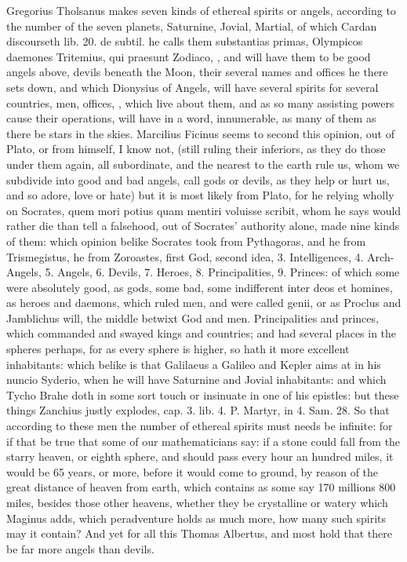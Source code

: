 {Gregorius Tholsanus makes seven kinds of ethereal spirits or
angels, according to the number of the seven planets, Saturnine,
Jovial, Martial, of which Cardan discourseth lib. 20. de subtil. he
calls them substantias primas, Olympicos daemones Tritemius, qui
praesunt Zodiaco, \etc{}, and will have them to be good angels above,
devils beneath the Moon, their several names and offices he there sets
down, and which Dionysius of Angels, will have several spirits for
several countries, men, offices, \etc{}, which live about them, and as so
many assisting powers cause their operations, will have in a word,
innumerable, as many of them as there be stars in the skies.
Marcilius Ficinus seems to second this opinion, out of Plato, or
from himself, I know not, (still ruling their inferiors, as they do
those under them again, all subordinate, and the nearest to the earth
rule us, whom we subdivide into good and bad angels, call gods or
devils, as they help or hurt us, and so adore, love or hate) but it is
most likely from Plato, for he relying wholly on Socrates, quem mori
potius quam mentiri voluisse scribit, whom he says would rather die
than tell a falsehood, out of Socrates' authority alone, made nine
kinds of them: which opinion belike Socrates took from Pythagoras, and
he from Trismegistus, he from Zoroastes, first God, second idea, 3.
Intelligences, 4. Arch-Angels, 5. Angels, 6. Devils, 7. Heroes, 8.
Principalities, 9. Princes: of which some were absolutely good, as
gods, some bad, some indifferent inter deos et homines, as heroes and
daemons, which ruled men, and were called genii, or as Proclus
and Jamblichus will, the middle betwixt God and men. Principalities and
princes, which commanded and swayed kings and countries; and had
several places in the spheres perhaps, for as every sphere is higher,
so hath it more excellent inhabitants: which belike is that Galilaeus a
Galileo and Kepler aims at in his nuncio Syderio, when he will have
Saturnine and Jovial inhabitants: and which Tycho Brahe doth in
some sort touch or insinuate in one of his epistles: but these things
Zanchius justly explodes, cap. 3. lib. 4. P. Martyr, in 4. Sam.
28.
So that according to these men the number of ethereal spirits must
needs be infinite: for if that be true that some of our mathematicians
say: if a stone could fall from the starry heaven, or eighth sphere,
and should pass every hour an hundred miles, it would be 65 years, or
more, before it would come to ground, by reason of the great distance
of heaven from earth, which contains as some say 170 millions 800
miles, besides those other heavens, whether they be crystalline or
watery which Maginus adds, which peradventure holds as much more, how
many such spirits may it contain? And yet for all this Thomas
Albertus, and most hold that there be far more angels than devils.
}
